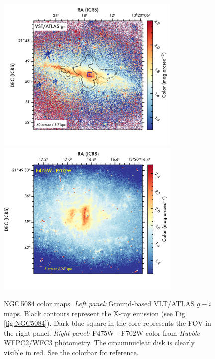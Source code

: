 \documentclass[modern]{CORE-AAS/aastex631}
\begin{document}
\begin{figure}[t!]
\begin{center}
\includegraphics[trim={0 20 40 0}, clip,  height = 7.5cm]{FIGURES/NGC5084_gi.png}
\includegraphics[trim={30 20 0 0}, clip,  height = 7.5cm]{FIGURES/NGC5084_F475W_F702W.png}
\caption{NGC\,5084 color maps. \emph{Left panel:} Ground-based VLT/ATLAS $g-i$ maps. Black contours represent the X-ray emission (see Fig.\,\ref{fig:NGC5084}). Dark blue square in the core represents the FOV in the right panel. \emph{Right panel:} F475W - F702W color from \emph{Hubble} WFPC2/WFC3 photometry. The circumnuclear disk is clearly visible in red. See the colorbar for reference.} 
\label{fig:NGC5084_color}
\end{center}
\end{figure}
\end{document}

